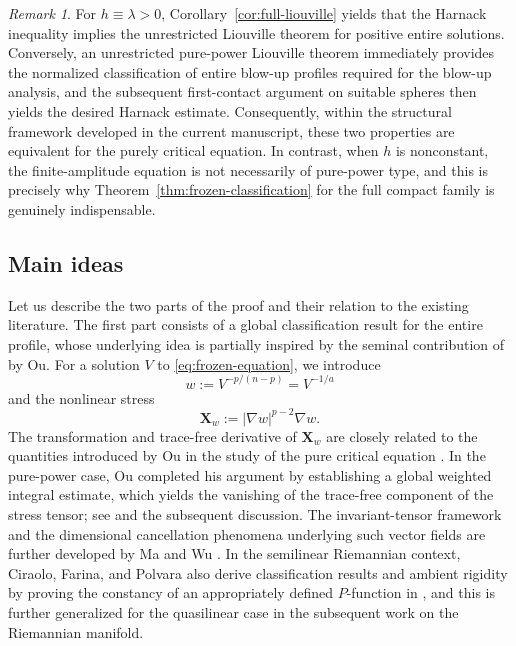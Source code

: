 \documentclass[reqno,12pt]{amsart}
\numberwithin{equation}{section}
\theoremstyle{remark}
\newtheorem{rem}[thm]{Remark}
\newcommand{\Xbf}{\mathbf X}
\begin{document}
\begin{rem} 
\label{rem:pure-power-equivalence}
For $h \equiv \lambda > 0$, Corollary~\ref{cor:full-liouville} yields that the Harnack inequality implies the unrestricted Liouville theorem for positive entire solutions. Conversely, an unrestricted pure-power Liouville theorem immediately provides the normalized classification of entire blow-up profiles required for the blow-up analysis, and the subsequent first-contact argument on suitable spheres then yields
the desired Harnack estimate. Consequently, within the structural framework developed in the current manuscript, these two properties are equivalent for the purely critical equation. In contrast, when $h$ is nonconstant, the finite-amplitude  equation is not necessarily of pure-power type, and this is precisely why Theorem~\ref{thm:frozen-classification} for the full compact family is genuinely indispensable.
\end{rem}

\subsection{Main ideas}

Let us describe the two parts of the proof and their relation to the existing literature.  The first part consists of a global classification result for the entire profile, whose underlying idea is  partially inspired by the seminal contribution of  \cite{O2025} by Ou.  For a solution $V$ to \eqref{eq:frozen-equation}, we introduce
\begin{equation}\label{eq:intro-transform}
 w:=V^{-p/(n-p)}=V^{-1/a}
\end{equation}
and the nonlinear stress
$$
 \Xbf_w:=|\nabla w|^{p-2}\nabla w.
$$
The transformation and trace-free derivative of $\Xbf_w$ are closely related to the quantities introduced by Ou in the study of the pure critical equation \cite[Lemma~2.1]{O2025}. In the pure-power case, Ou completed his argument by establishing a global weighted integral estimate, which yields the vanishing of the trace-free component of the stress tensor; see \cite[(3.34)]{O2025} and the subsequent discussion. The invariant-tensor framework and the dimensional cancellation phenomena underlying such vector fields are further developed by Ma and Wu \cite[Section~2.3, (2.8)]{MW2024}. In the semilinear Riemannian context, Ciraolo, Farina, and Polvara also derive  classification results and ambient rigidity by proving the constancy of an appropriately defined $P$-function in \cite{CFP2025}, and this is further generalized  for the quasilinear case  in the subsequent work \cite{SW2025} on the Riemannian manifold.
\end{document}

